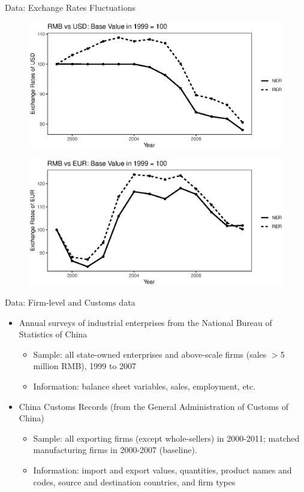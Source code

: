 \documentclass[10pt]{beamer}
\begin{document}
\begin{frame}{Data: Exchange Rates Fluctuations}
    \begin{figure}[htbp]
	\centering
	\includegraphics[width=0.65\columnwidth]{R/USD.eps}
        \label{fig.USD}
    \end{figure}
    \begin{figure}[htbp]
	\centering
	\includegraphics[width=0.65\columnwidth]{R/EUR.eps}
	\label{fig.EUR}
    \end{figure}
\end{frame}

\begin{frame}{Data: Firm-level and Customs data}
    \begin{itemize}
	\item Annual surveys of industrial enterprises from the National Bureau of Statistics of China
	\begin{itemize}
		\item Sample: all state-owned enterprises and above-scale firms (sales $>$5 million RMB), 1999 to 2007 
            \item Information: balance sheet variables, sales, employment, etc.
	\end{itemize}
        \medskip
        \item China Customs Records (from the General Administration of Customs of China)
        \begin{itemize}
            \item Sample: all exporting firms (except whole-sellers) in 2000-2011; matched manufacturing firms in 2000-2007 (baseline).
            \item Information: import and export values, quantities, product names and codes, source and destination countries, and firm types
	\end{itemize}
    \end{itemize}
\end{frame}
\end{document}
